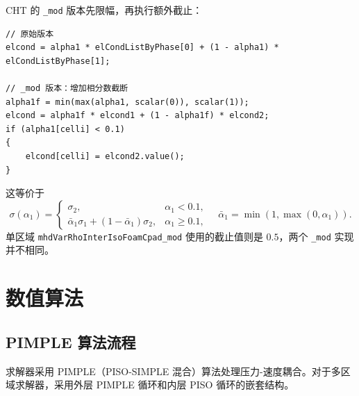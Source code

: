 \documentclass[11pt,a4paper]{article}
\begin{document}
CHT 的 \texttt{\_mod} 版本先限幅，再执行额外截止：

\begin{lstlisting}[style=cppstyle]
// 原始版本
elcond = alpha1 * elCondListByPhase[0] + (1 - alpha1) * elCondListByPhase[1];

// _mod 版本：增加相分数截断
alpha1f = min(max(alpha1, scalar(0)), scalar(1));
elcond = alpha1f * elcond1 + (1 - alpha1f) * elcond2;
if (alpha1[celli] < 0.1)
{
    elcond[celli] = elcond2.value();
}
\end{lstlisting}

这等价于
\begin{equation}
\sigma(\alpha_1)=
\begin{cases}
\sigma_2, & \alpha_1<0.1,\\
\bar\alpha_1\sigma_1+(1-\bar\alpha_1)\sigma_2,
& \alpha_1\ge 0.1,
\end{cases}
\quad
\bar\alpha_1=\min(1,\max(0,\alpha_1)).
\end{equation}
单区域 \texttt{mhdVarRhoInterIsoFoamCpad\_mod} 使用的截止值则是
$0.5$，两个 \texttt{\_mod} 实现并不相同。

\section{数值算法}

\subsection{PIMPLE 算法流程}

求解器采用 PIMPLE（PISO-SIMPLE 混合）算法处理压力-速度耦合。对于多区域求解器，采用外层 PIMPLE 循环和内层 PISO 循环的嵌套结构。
\end{document}
